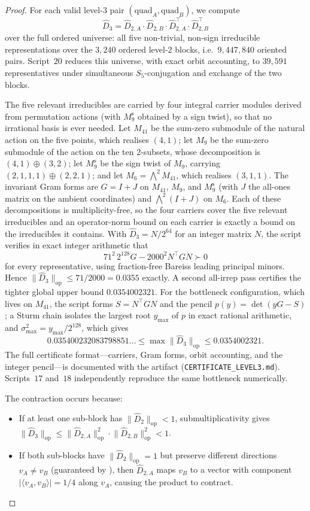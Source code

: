\documentclass[version=final]{iacrcc}
\newcommand{\norm}[1]{\lVert #1 \rVert}
\newcommand{\abs}[1]{\lvert #1 \rvert}
\newcommand{\opn}[1]{\norm{#1}_{\mathrm{op}}}
\newcommand{\Dhat}{\widehat{D}}
\begin{document}
\begin{proof}
For each valid level-$3$ pair $(\mathrm{quad}_A, \mathrm{quad}_B)$, we compute
\[
\Dhat_3 = \Dhat_{2,A} \cdot \Dhat_{2,B} \cdot \Dhat_{2,A}^\top \cdot \Dhat_{2,B}^\top
\]
over the full ordered universe: all five non-trivial, non-sign irreducible
representations over the $3{,}240$ ordered level-$2$ blocks, i.e.\ $9{,}447{,}840$
oriented pairs. Script~$20$ reduces this universe, with exact orbit accounting,
to $39{,}591$ representatives under simultaneous $S_5$-conjugation and exchange
of the two blocks.

The five relevant irreducibles are carried by four integral carrier modules
derived from permutation actions (with $M_9^{\mathrm{s}}$ obtained by a sign
twist), so that no irrational basis is ever needed. Let $M_{41}$ be the sum-zero
submodule of the natural action on the five points, which realises $(4,1)$; let
$M_9$ be the sum-zero submodule of the action on the ten $2$-subsets, whose
decomposition is $(4,1)\oplus(3,2)$; let $M_{9}^{\mathrm{s}}$ be the sign twist
of $M_9$, carrying $(2,1,1,1)\oplus(2,2,1)$; and let
$M_6 = \textstyle\bigwedge^2 M_{41}$, which realises $(3,1,1)$. The invariant
Gram forms are $G = I + J$ on $M_{41}$, $M_9$, and $M_9^{\mathrm{s}}$ (with $J$
the all-ones matrix on the ambient coordinates) and $\bigwedge^2(I+J)$ on $M_6$.
Each of these decompositions is multiplicity-free, so the four carriers cover
the five relevant irreducibles and an operator-norm bound on each carrier is
exactly a bound on the irreducibles it contains. With $\Dhat_3 = N/2^{64}$ for
an integer matrix $N$, the script verifies in exact integer arithmetic that
\[
  71^2\,2^{128}G-2000^2N^\top G N \succ 0
\]
for every representative, using fraction-free Bareiss leading principal
minors. Hence $\opn{\Dhat_3}\le71/2000=0.0355$ exactly. A second all-irrep pass
certifies the tighter global upper bound $0.0354002321$. For the bottleneck
configuration, which lives on $M_{41}$, the script forms $S = N^\top G N$ and
the pencil $p(y) = \det(yG - S)$; a Sturm chain isolates the largest root
$y_{\max}$ of $p$ in exact rational arithmetic, and
$\sigma_{\max}^2 = y_{\max}/2^{128}$, which gives
\[
  0.035400232083798851\ldots
  \le \max\opn{\Dhat_3} \le 0.0354002321.
\]
The full certificate format---carriers, Gram forms, orbit accounting, and the
integer pencil---is documented with the artifact
(\texttt{CERTIFICATE\_LEVEL3.md}). Scripts~$17$ and~$18$ independently
reproduce the same bottleneck numerically.

The contraction occurs because:
\begin{itemize}[nosep]
\item If at least one sub-block has $\opn{\Dhat_2} < 1$, submultiplicativity gives
  $\opn{\Dhat_3} \leq \opn{\Dhat_{2,A}}^2 \cdot \opn{\Dhat_{2,B}}^2 < 1$.
\item If both sub-blocks have $\opn{\Dhat_2} = 1$ but preserve different directions
  $v_A \neq v_B$ (guaranteed by ), then $\Dhat_{2,A}$ maps $v_B$
  to a vector with component $\abs{\langle v_A, v_B \rangle} = 1/4$ along $v_A$,
  causing the product to contract. \qedhere
\end{itemize}
\end{proof}
\end{document}
